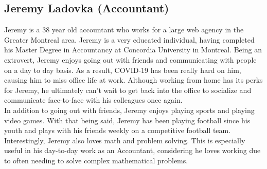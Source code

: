\documentclass[11pt,onside]{report}
\begin{document}
\subsection{Jeremy Ladovka (Accountant)}
Jeremy is a 38 year old accountant who works for a large web agency in the Greater Montreal area. Jeremy is a very educated individual, having completed his Master Degree in Accountancy at Concordia University in Montreal. Being an extrovert, Jeremy enjoys going out with friends and communicating with people on a day to day basis. As a result, COVID-19 has been really hard on him, causing him to miss office life at work. Although working from home has its perks for Jeremy, he ultimately can’t wait to get back into the office to socialize and communicate face-to-face with his colleagues once again. \\

In addition to going out with friends, Jeremy enjoys playing sports and playing video games. With that being said, Jeremy has been playing football since his youth and plays with his friends weekly on a competitive football team. Interestingly, Jeremy also loves math and problem solving. This is especially useful in his day-to-day work as an Accountant, considering he loves working due to often needing to solve complex mathematical problems. \\
\end{document}
